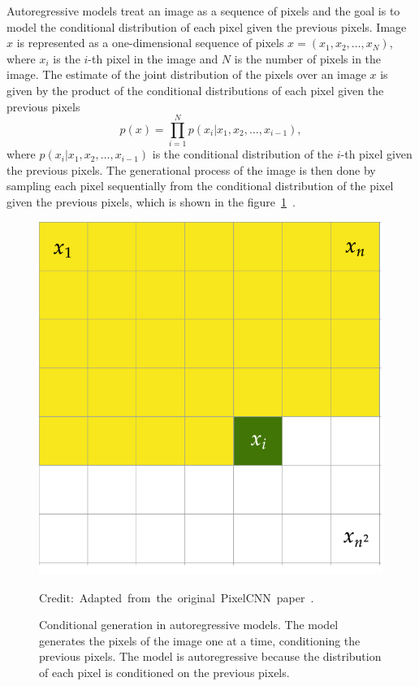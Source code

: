 Autoregressive models treat an image as a sequence of pixels and the goal is to model the conditional distribution of each pixel given the previous pixels.
Image $x$ is represented as a one-dimensional sequence of pixels $x = (x_1, x_2, \dots, x_N)$, where $x_i$ is the $i$-th pixel in the image and $N$ is the number of pixels in the image. The estimate of the joint distribution of the pixels over an image $x$ is given by the product of the conditional distributions of each pixel given the previous pixels
\[ p(x) = \prod_{i=1}^{N} p(x_i|x_1, x_2, \dots, x_{i-1}),\]
where $p(x_i|x_1, x_2, \dots, x_{i-1})$ is the conditional distribution of the $i$-th pixel given the previous pixels. The generational process of the image is then done by sampling each pixel sequentially from the conditional distribution of the pixel given the previous pixels, which is shown in the figure~\ref{PixelCNNFigure}~\cite{pixelcnn}.


\begin{figure}
    \centering 
    \includegraphics[scale=0.20]{figures/pixelcnn.png}
    \caption[Conditional generation in autoregressive models]%
    {Conditional generation in autoregressive models. The model generates the pixels of the image one at a time, conditioning the previous pixels. The model is autoregressive because the distribution of each pixel is conditioned on the previous pixels.}
  	\medskip 
    \hspace*{15pt}\hbox{\scriptsize Credit: Adapted from the original PixelCNN paper~\cite{pixelcnn}.}\label{PixelCNNFigure}
\end{figure}

